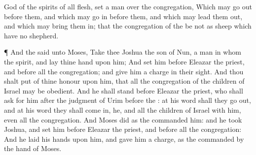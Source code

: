 {God of the
spirits of all
flesh,
set a
man over the
congregation,
Which may go
out
before them, and which may go
in
before them, and which may lead them
out, and which may bring them
in; that the
congregation of the
{} be not as
sheep which have no
shepherd.
\par }{\PP {}¶ And the
{}
said unto
Moses,
Take thee
Joshua the
son of
Nun, a
man in whom
{} the
spirit, and
lay thine
hand upon him;
And
set him
before
Eleazar the
priest, and
before all the
congregation; and give him a
charge in their
sight.
And thou shalt
put
{} of thine
honour upon him, that all the
congregation of the
children of
Israel may be
obedient.
And he shall
stand
before
Eleazar the
priest, who shall
ask
{} for him after the
judgment of
Urim
before the
{}: at his
word shall they go
out, and at his
word they shall come
in,
{} he, and all the
children of
Israel with him, even all the
congregation.
And
Moses
did as the
{}
commanded him: and he
took
Joshua, and
set him
before
Eleazar the
priest, and
before all the
congregation:
And he
laid his
hands upon him, and gave him a
charge, as the
{}
commanded by the
hand of
Moses.

}
